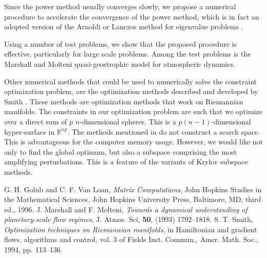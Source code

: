 \documentclass{report}
\begin{document}
Since the power method usually converges slowly, we propose a numerical
procedure to accelerate the convergence of the power method, which is
in fact an adopted version of the Arnoldi or Lanczos method for eigenvalue
problems \cite{golub}.

Using a number of test problems, we show that the proposed procedure is
effective, particularly for large scale problems.
Among the test problems is the Marshall and Molteni quasi-geostrophic model
\cite{molteni} for atmospheric dynamics.

Other numerical methods that could be used to numerically solve the
constraint optimization problem, are the optimization methods described
and developed by Smith \cite{smith}.
These methods are optimization methods that work on Riemannian manifolds.
The constraints in our optimization problem are such that we optimize over
a direct sum of $p$ $n$-dimensional spheres. This is a $p(n-1)$-dimensional
hyper-surface in $\mathbb{R}^{np}$.
The methods mentioned in \cite{smith} do not construct a search
space. This is advantageous for the computer memory usage.
However, we would like not only to find the global optimum, but also
a subspace comprising the most amplifying perturbations.
This is a feature of the variants of Krylov subspace methods.

G. H. Golub and C. F. Van Loan, {\it Matrix Computations}, John Hopkins
Studies in the Mathematical Sciences, John Hopkins University Press,
Baltimore, MD, third ed., 1996.
J. Marshall and F. Molteni, {\it Towards a dynamical understanding of
planetary-scale flow regimes}, J. Atmos. Sci, {\bf 50}, (1993) 1792--1818.
S. T. Smith, {\it Optimization techniques on {R}iemannian manifolds}, in
Hamiltonian and gradient flows, algorithms and control, vol. 3 of Fields
Inst. Commun., Amer. Math. Soc., 1994, pp. 113--136.
\end{document}
